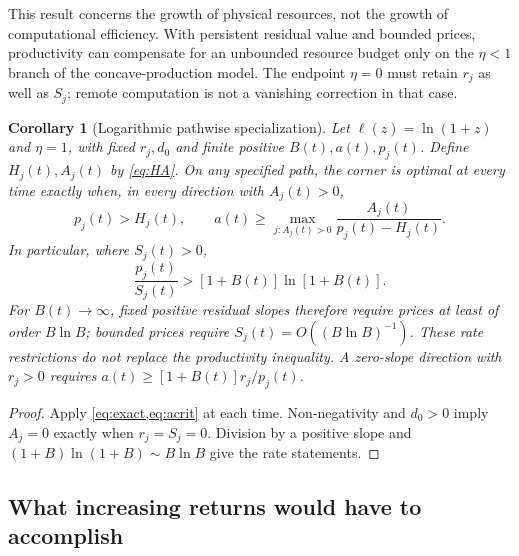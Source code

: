 \documentclass[11pt,a4paper]{article}
\newtheorem{corollary}[proposition]{Corollary}
\theoremstyle{definition}\newtheorem{definition}{Definition}
\begin{document}
This result concerns the growth of physical resources, not the growth
of computational efficiency. With persistent residual value and bounded
prices, productivity can compensate for an unbounded resource budget
only on the $\eta<1$ branch of the concave-production model. The endpoint
$\eta=0$ must retain $r_j$ as well as $S_j$; remote computation is not a
vanishing correction in that case.

\begin{corollary}[Logarithmic pathwise specialization]
\label{prop:persistence}
Let $\ell(z)=\ln(1+z)$ and $\eta=1$, with fixed $r_j,d_0$ and finite
positive $B(t),a(t),p_j(t)$. Define $H_j(t),A_j(t)$ by
\cref{eq:HA}. On any specified path, the corner is optimal at every
time exactly when, in every direction with $A_j(t)>0$,
\begin{equation}
 p_j(t)>H_j(t),\qquad
 a(t)\geq\max_{j:A_j(t)>0}
       \frac{A_j(t)}{p_j(t)-H_j(t)}.
 \label{eq:pathwise}
\end{equation}
In particular, where $S_j(t)>0$,
\begin{equation}
 \frac{p_j(t)}{S_j(t)}>[1+B(t)]\ln[1+B(t)].
 \label{eq:path-ratio}
\end{equation}
For $B(t)\to\infty$, fixed positive residual slopes therefore require
prices at least of order $B\ln B$; bounded prices require
$S_j(t)=O((B\ln B)^{-1})$. These rate restrictions do not replace the
productivity inequality. A zero-slope direction with $r_j>0$ requires
$a(t)\geq[1+B(t)]r_j/p_j(t)$.
\end{corollary}
\begin{proof}
Apply \cref{eq:exact,eq:acrit} at each time. Non-negativity and $d_0>0$
imply $A_j=0$ exactly when $r_j=S_j=0$. Division by a positive slope
and $(1+B)\ln(1+B)\sim B\ln B$ give the rate statements.
\end{proof}


\subsection{What increasing returns would have to accomplish}
\end{document}
